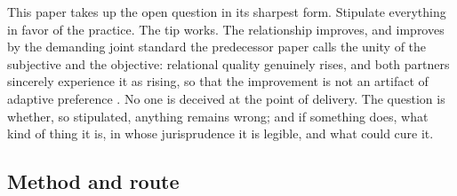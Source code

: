 This paper takes up the open question in its sharpest form. Stipulate everything in favor of the practice. The tip works. The relationship improves, and improves by the demanding joint standard the predecessor paper calls the unity of the subjective and the objective: relational quality genuinely rises, and both partners sincerely experience it as rising, so that the improvement is not an artifact of adaptive preference \parencite{sen1999development,nussbaum2000women}. No one is deceived at the point of delivery. The question is whether, so stipulated, anything remains wrong; and if something does, what kind of thing it is, in whose jurisprudence it is legible, and what could cure it.

\subsection{Method and route}
\label{p02:sec:intro-method}

